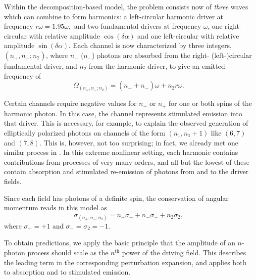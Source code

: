 Within the decomposition-based model, the problem consists now of \textit{three} waves which can combine to form harmonics: a left-circular harmonic driver at frequency $r\omega=1.95\omega,$ and two fundamental drivers at frequency $\omega$, one right-circular with relative amplitude $\cos(\delta\alpha)$ and one left-circular with relative amplitude $\sin(\delta\alpha)$. Each channel is now characterized by three integers, $(n_+,n_-;n_2)$, where $n_+$ ($n_-$) photons are absorbed from the right- (left-)circular fundamental driver, and $n_2$ from the harmonic driver, to give an emitted frequency of
\begin{equation}
 \Omega_{(n_+,n_-;n_2)}=(n_+ + n_-)\omega+n_2r\omega.
 \label{e8-model-2-energy-conservation}
\end{equation}


Certain channels require negative values for $n_-$ or $n_+$ for one or both spins of the harmonic photon. In this case, the channel represents stimulated emission into that driver. This is necessary, for example, to explain the observed generation of elliptically polarized photons on channels of the form $(n_1,n_1+1)$ like $(6,7)$ and $(7,8)$. This is, however, not too surprising; in fact, we already met one similar process in . In this extreme nonlinear setting, each harmonic contains contributions from processes of very many orders, and all but the lowest of these contain absorption and stimulated re-emission of photons from and to the driver fields.

Since each field has photons of a definite spin, the conservation of angular momentum reads in this model as
\begin{equation}
 \sigma_{(n_+,n_-;n_2)}=n_+\sigma_+ + n_-\sigma_- + n_2\sigma_2,
 \label{e8-model-2-angular-momentum-conservation}
\end{equation}
where $\sigma_+=+1$ and $\sigma_-=\sigma_2=-1$.


To obtain predictions, we apply the basic principle that the amplitude of an $n$-photon process should scale as the $n^\text{th}$ power of the driving field. This describes the leading term in the corresponding perturbation expansion, and applies both to absorption and to stimulated emission.


